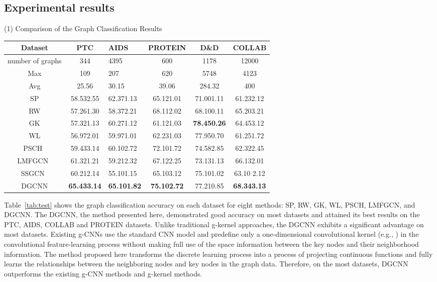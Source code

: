\documentclass[11pt]{article}
\begin{document}
\subsection{Experimental results}
(1) Comparison of the Graph Classification Results


\begin {table*}[!htbp]
\small
 \caption{\label{tab:test}Comparison of Classification precision between four graph kernel and two graph CNN Methods on Multiple Graph Datasets} \centering
 \vspace{0.2in}
 \begin{tabular}{cclccc}
  \toprule
  Dataset & PTC & AIDS & PROTEIN & D\&D &  COLLAB \\
  \midrule
 number of graphs & 344 & 4395 & 600 & 1178  & 12000 \\
 Max & 109 & 207 & 620 & 5748  & 4123 \\
 Avg & 25.56 & 30.15 & 39.06 & 284.32  & 400 \\\hline
 SP & 58.532.55 & 62.371.13&65.121.01&71.001.11 &61.232.12 \\
 RW & 57.261.30 & 58.372.21&68.112.02&68.100.11 & 65.203.21 \\
 GK & 57.321.13& 60.271.12&61.121.03&\textbf{78.450.26}& 64.453.12 \\
 WL & 56.972.01 & 59.971.01&62.231.03&77.950.70 & 61.251.72 \\\hline
 PSCH~\cite{Niepert2016Learning_10} & 59.433.14 & 60.102.72&72.101.72&74.582.85 & 62.322.45\\
 LMFGCN~\cite{Duvenaud2015Convolutional} & 61.321.21 & 59.212.32 & 67.122.25 & 73.131.13 & 66.132.01\\
 SSGCN~\cite{Kipf2016Semi_14} & 60.212.14 & 55.101.15&65.103.12&75.101.02 & 63.10 2.12 \\\hline
 DGCNN & \textbf{65.433.14} & \textbf{65.101.82}& \textbf{75.102.72} &77.210.85 & \textbf{68.343.13} \\
  \bottomrule
 \end{tabular}
\end{table*}



Table~\ref{tab:test} shows the graph classification accuracy on each dataset for eight methods: SP, RW, GK, WL, PSCH, LMFGCN, and DGCNN. The DGCNN, the method presented here, demonstrated good accuracy on most datasets and attained its best results on the PTC, AIDS, COLLAB and PROTEIN datasets. Unlike traditional g-kernel approaches, the DGCNN exhibits a significant advantage on most datasets. Existing g-CNNs use the standard CNN model and predefine only a one-dimensional convolutional kernel (e.g., ) in the convolutional feature-learning process without making full use of the space information between the key nodes and their neighborhood information. The method proposed here transforms the discrete learning process into a process of projecting continuous functions and fully learns the relationships between the neighboring nodes and key nodes in the graph data. Therefore, on the most datasets, DGCNN outperforms the existing g-CNN methods and g-kernel methods.
\end{document}

